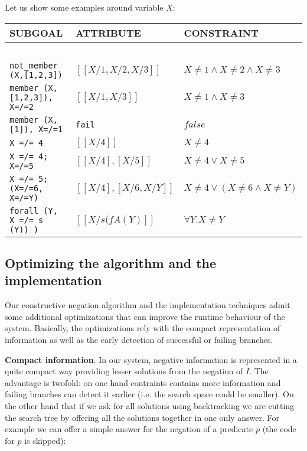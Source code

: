 \documentclass{llncs}
\begin{document}
Let us show some examples around variable $X$:

\begin{center}
\begin{small}
\begin{tabular}{lll}
SUBGOAL & ATTRIBUTE & CONSTRAINT \\
\hline\hline
\ \\
{\tt not\_member (X,[1,2,3])}   &  $[[X/1,X/2,X/3]]$  & $X \neq 1 \wedge X \neq 2 \wedge X \neq 3$\\
{\tt member (X,[1,2,3]), X=/=2} &  $[[X/1,X/3]]$       & $X \neq 1 \wedge X \neq 3$\\
{\tt member (X,[1]), X=/=1}     &  {\tt fail}          & $false$ \\
{\tt X =/= 4}                   & $[[X/4]]$            & $X \neq 4$ \\
{\tt X =/= 4; X=/=5}            & $[[X/4], [X/5]]$     & $X \neq 4 \vee X \neq 5$ \\
{\tt X =/= 5; (X=/=6, X=/=Y)}   & $[[X/4],[X/6, X/Y]]$ & $X \neq 4 \vee (X \neq 6 \wedge X \neq Y)$\\
{\tt forall (Y, X =/= s (Y)) )}     & $[[X/s(fA(Y)]]$  & $\forall Y. X \neq Y$ \\
\end{tabular}
\end{small}
\end{center}




\subsection{Optimizing the algorithm and the implementation}
\label{optimization}

Our constructive negation algorithm and the implementation techniques
admit some additional optimizations that can improve the runtime
behaviour of the system. Basically, the optimizations rely with the
compact representation of information as well as the early detection
of successful or failing branches.

\noindent
{\bf Compact information}. In our system, negative information is
represented in a quite compact way providing lesser solutions from the
negation of $\overline{I}$. The advantage is twofold: on one hand
contraints contains more information and failing branches can detect
it earlier (i.e. the search space could be smaller). On the other hand
that if we ask for all solutions using backtracking we are cutting the
search tree by offering all the solutions together in one only
answer. For example we can offer a simple answer for the negation of a
predicate $p$ (the code for $p$ is skipped):
\end{document}
